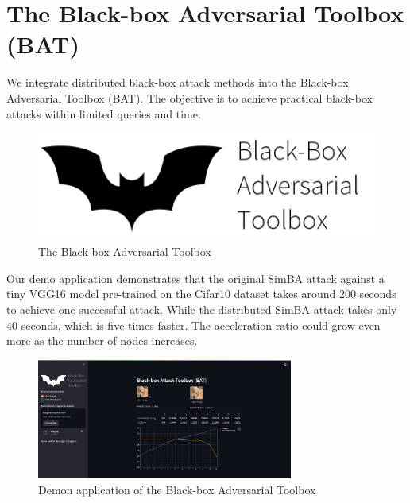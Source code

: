 
\section{The Black-box Adversarial Toolbox (BAT)}
\label{sec:bat}

We integrate distributed black-box attack methods into the Black-box Adversarial Toolbox (BAT). The objective is to achieve practical black-box attacks within limited queries and time.

\begin{figure}[H]
\centering
\includegraphics[scale=0.35]{figures/chapter_classification/bat.png}
\caption{The Black-box Adversarial Toolbox}
\label{fig.bat}
\end{figure}

Our demo application demonstrates that the original SimBA attack against a tiny VGG16 model pre-trained on the Cifar10 dataset takes around 200 seconds to achieve one successful attack. While the distributed SimBA attack takes only 40 seconds, which is five times faster. The acceleration ratio could grow even more as the number of nodes increases.

\begin{figure}[H]
\centering
\includegraphics[width=0.75\textwidth]{figures/chapter_classification/bat_app.png}
\caption{Demon application of the Black-box Adversarial Toolbox}
\label{fig.bat_app}
\end{figure}

\clearpage

